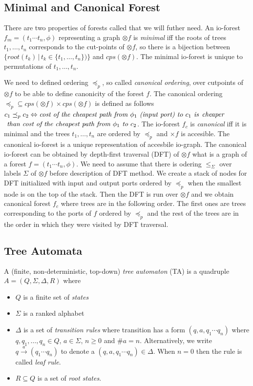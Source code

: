 \subsection{Minimal and Canonical Forest}
\label{subsec:mcforest}

There are two properties of forests called that we will futher need.
An io-forest $f_m=(t_1 \cdots t_n, \phi)$ representing a graph $\otimes f$ is \emph{minimal}
iff the roots of trees $t_1,\ldots,t_n$ corresponds to the cut-points of $\otimes f$,
so there is a bijection between $\{root(t_k)\,|\, t_k \in \{t_1, \ldots, t_n\} )\}$ and $cps(\otimes f)$.
The minimal io-forest is unique to permutations of $t_1,\ldots,t_n$.

We need to defined ordering $\preceq_p$, so called \emph{canonical ordering}, over cutpoints of $\otimes f$ to be able to define canonicity of the forest $f$.
The canonical ordering $\preceq_p \subseteq cps(\otimes f) \times cps(\otimes f)$ is defined as follows $c_1 \preceq_p c_2 \Leftrightarrow \emph{cost of the cheapest path from }
\phi_1 \emph{ (input port) to } c_1 \emph{ is}$ $\emph{cheaper}$ $\emph{ than cost of the cheapest path from } \phi_1 \emph{ to } c_2$.
The io-forest $f_c$ is \emph{canonical} iff it is minimal and the trees $t_1,\ldots, t_n$ are ordered by $\preceq_p$ and $\times f$ is accesible.
The canonical io-forest is a unique representation of accesbile io-graph.
The canonical io-forest can be obtained by depth-first traversal (DFT) of $\otimes f$ what is a graph of a forest $f = (t_1 \cdots t_n, \phi)$.
We need to assume that there is odering $\leq_\Sigma$ over labels $\Sigma$ of $\otimes f$ before description of DFT method.
We create a stack of nodes for DFT initialized with input and output ports ordered by $\preceq_p$ when the smallest node is on the top of the stack.
Then the DFT is run over $\otimes f$ and we obtain canonical forest $f_c$ where trees are in the following order.
The first ones are trees corresponding to the ports of $f$ ordered by $\preceq_p$ and the rest of the trees are in the order
in which they were visited by DFT traversal.


\subsection{Tree Automata}
\label{subsec:ta}

A (finite, non-deterministic, top-down) \emph{tree automaton} (TA) is a
quadruple $A = (Q, \Sigma, \Delta, R)$ where
\begin{itemize}
	\item $Q$ is a finite set of \emph{states}
	\item $\Sigma$ is a ranked alphabet
	\item $\Delta$ is a set of \emph{transition rules} where transition has a form $(q,a,q_1 \cdots q_n)$ where $q,q_1,\ldots,q_n \in Q$, $a \in \Sigma$, $n \geq 0$ and $\#a = n$.
		Alternatively, we write $q \xrightarrow{a} (q_1 \cdots q_n)$ to denote a $(q,a,q_1 \cdots q_n) \in \Delta$.
		When $n=0$ then the rule is called \emph{leaf rule}.
	\item $R \subseteq Q$ is a set of \emph{root states}.
\end{itemize}

